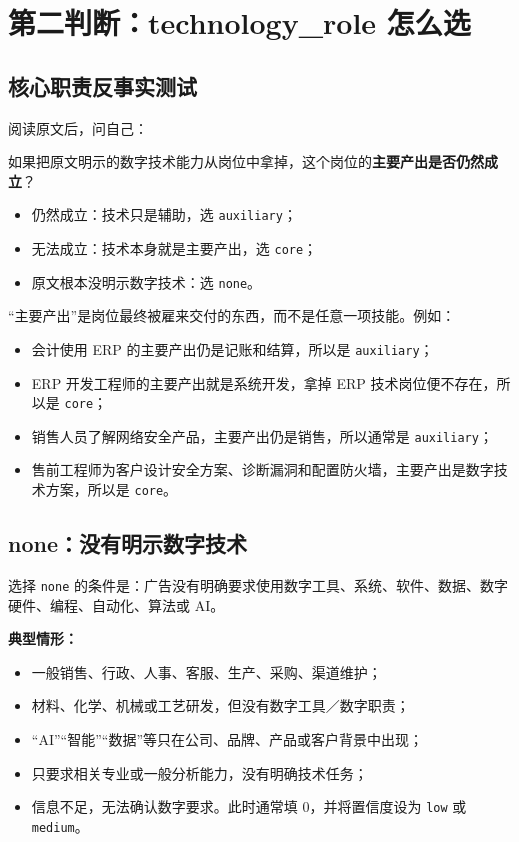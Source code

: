 \documentclass[11pt,a4paper,fontset=none]{ctexart}
\begin{document}
\section{第二判断：technology\_role 怎么选}

\subsection{核心职责反事实测试}

阅读原文后，问自己：

\begin{keybox}[核心职责反事实测试]
如果把原文明示的数字技术能力从岗位中拿掉，这个岗位的\textbf{主要产出是否仍然成立}？
\begin{itemize}
  \item 仍然成立：技术只是辅助，选 \texttt{auxiliary}；
  \item 无法成立：技术本身就是主要产出，选 \texttt{core}；
  \item 原文根本没明示数字技术：选 \texttt{none}。
\end{itemize}
\end{keybox}

“主要产出”是岗位最终被雇来交付的东西，而不是任意一项技能。例如：

\begin{itemize}
  \item 会计使用 ERP 的主要产出仍是记账和结算，所以是 \texttt{auxiliary}；
  \item ERP 开发工程师的主要产出就是系统开发，拿掉 ERP 技术岗位便不存在，所以是 \texttt{core}；
  \item 销售人员了解网络安全产品，主要产出仍是销售，所以通常是 \texttt{auxiliary}；
  \item 售前工程师为客户设计安全方案、诊断漏洞和配置防火墙，主要产出是数字技术方案，所以是 \texttt{core}。
\end{itemize}

\subsection{none：没有明示数字技术}

选择 \texttt{none} 的条件是：广告没有明确要求使用数字工具、系统、软件、数据、数字硬件、编程、自动化、算法或 AI。

\textbf{典型情形：}
\begin{itemize}
  \item 一般销售、行政、人事、客服、生产、采购、渠道维护；
  \item 材料、化学、机械或工艺研发，但没有数字工具／数字职责；
  \item “AI”“智能”“数据”等只在公司、品牌、产品或客户背景中出现；
  \item 只要求相关专业或一般分析能力，没有明确技术任务；
  \item 信息不足，无法确认数字要求。此时通常填 0，并将置信度设为 \texttt{low} 或 \texttt{medium}。
\end{itemize}
\end{document}
